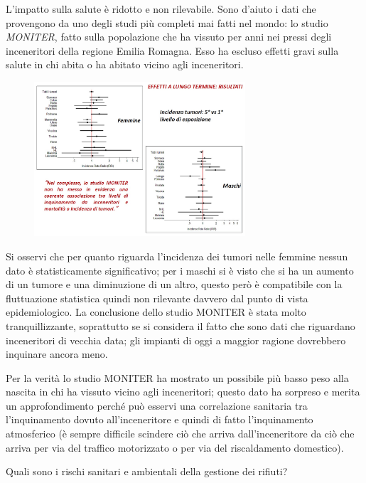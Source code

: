 L'impatto sulla salute è ridotto e non rilevabile. Sono d'aiuto i dati
che provengono da uno degli studi più completi mai fatti nel mondo: lo
studio \emph{MONITER}, fatto sulla popolazione che ha vissuto per anni
nei pressi degli inceneritori della regione Emilia Romagna. Esso ha
escluso effetti gravi sulla salute in chi abita o ha abitato vicino agli
inceneritori.

\begin{figure}[!ht]
\centering
	\includegraphics[width=0.7\textwidth]{23/image16.jpg}
	\end{figure}

Si osservi che per quanto riguarda l'incidenza dei tumori nelle femmine
nessun dato è statisticamente significativo; per i maschi si è visto che
si ha un aumento di un tumore e una diminuzione di un altro, questo però
è compatibile con la fluttuazione statistica quindi non rilevante
davvero dal punto di vista epidemiologico. La conclusione dello studio
MONITER è stata molto tranquillizzante, soprattutto se si considera il
fatto che sono dati che riguardano inceneritori di vecchia data; gli
impianti di oggi a maggior ragione dovrebbero inquinare ancora meno.

Per la verità lo studio MONITER ha mostrato un possibile più basso peso
alla nascita in chi ha vissuto vicino agli inceneritori; questo dato ha
sorpreso e merita un approfondimento perché può esservi una correlazione
sanitaria tra l'inquinamento dovuto all'inceneritore e quindi di fatto
l'inquinamento atmosferico (è sempre difficile scindere ciò che arriva
dall'inceneritore da ciò che arriva per via del traffico motorizzato o
per via del riscaldamento domestico).

Quali sono i rischi sanitari e ambientali della gestione dei rifiuti?

